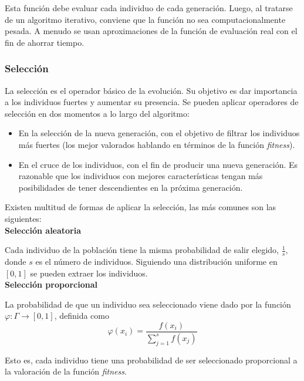 			Esta funci\'on debe evaluar cada individuo de cada generaci\'on. Luego, al tratarse de un algoritmo iterativo, conviene que la funci\'on no sea computacionalmente pesada. A menudo se usan aproximaciones de la funci\'on de evaluaci\'on real con el fin de ahorrar tiempo.\\
		
			\subsubsection{Selecci\'on}
			La selecci\'on es el operador b\'asico de la evoluci\'on. Su objetivo es dar importancia a los individuos fuertes y aumentar su presencia. Se pueden aplicar operadores de selecci\'on en dos momentos a lo largo del algoritmo:\\
			
			\begin{itemize}
				\item En la selecci\'on de la nueva generaci\'on, con el objetivo de filtrar los individuos m\'as fuertes (los mejor valorados hablando en t\'erminos de la funci\'on \textit{fitness}).
				\item En el cruce de los individuos, con el fin de producir una nueva generaci\'on. Es razonable que los individuos con mejores caracter\'isticas tengan m\'as posibilidades de tener descendientes en la pr\'oxima generaci\'on.
			\end{itemize}
			
			\hspace{0.25cm}Existen multitud de formas de aplicar la selecci\'on, las m\'as comunes son las siguientes:\\
			
			\textbf{Selecci\'on aleatoria}
			
			Cada individuo de la poblaci\'on tiene la misma probabilidad de salir elegido, $\frac{1}{s}$, donde $s$ es el n\'umero de individuos. Siguiendo una distribuci\'on uniforme en $[0,1]$ se pueden extraer los individuos.\\
			
			\textbf{Selecci\'on proporcional}
			
			La probabilidad de que un individuo sea seleccionado viene dado por la funci\'on $\varphi:\Gamma\rightarrow [0,1]$, definida como
			\[\varphi(x_i)=\frac{f(x_i)}{\sum\limits_{j=1}^{s}f(x_j)}\]
			
			Esto es, cada individuo tiene una probabilidad de ser seleccionado proporcional a la valoraci\'on de la funci\'on \textit{fitness}.\\
			
